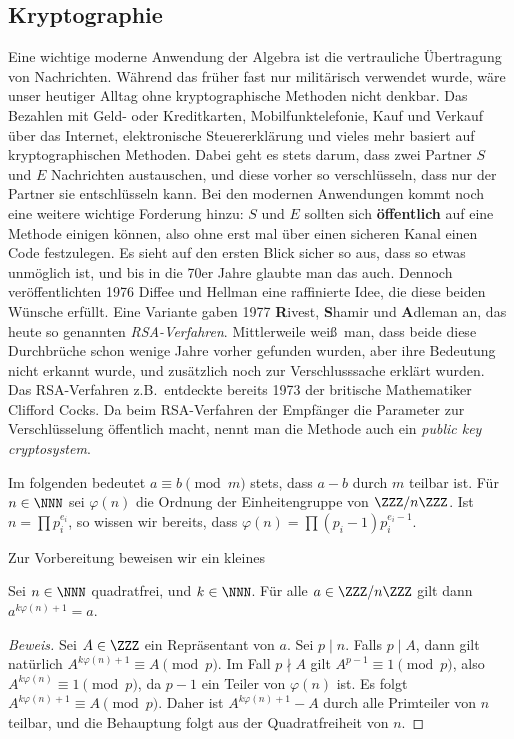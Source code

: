 \documentclass[12pt,a4paper,twoside]{article}
\newcommand{\ei}[1]{\emph{#1}\index{#1}}
\begin{document}
\subsection{Kryptographie}
Eine wichtige moderne Anwendung der Algebra ist die vertrauliche \"Ubertragung
von Nachrichten. W\"ahrend das fr\"uher fast nur milit\"arisch verwendet
wurde, w\"are unser heutiger Alltag ohne kryptographische Methoden nicht
denkbar. Das Bezahlen mit Geld- oder Kreditkarten, Mobilfunktelefonie, Kauf
und Verkauf \"uber das Internet, elektronische Steuererkl\"arung und vieles
mehr basiert auf kryptographischen Methoden. Dabei geht es stets darum, dass
zwei Partner $S$ und $E$ Nachrichten austauschen, und diese vorher so
verschl\"usseln, dass nur der Partner sie entschl\"usseln kann. Bei den
modernen Anwendungen kommt noch eine weitere wichtige Forderung hinzu: $S$ und
$E$ sollten sich \textbf{\"offentlich} auf eine Methode einigen k\"onnen, also
ohne erst mal \"uber einen sicheren Kanal einen Code festzulegen. Es sieht auf
den ersten Blick sicher so aus, dass so etwas unm\"oglich ist, und bis in die
70er Jahre glaubte man das auch. Dennoch ver\"offentlichten 1976 Diffee und
Hellman eine raffinierte Idee, die diese beiden W\"unsche erf\"ullt. Eine
Variante gaben 1977 \textbf{R}ivest, \textbf{S}hamir und \textbf{A}dleman an,
das heute so genannten \ei{RSA-Verfahren}. Mittlerweile wei\ss\ man, dass
beide diese Durchbr\"uche schon wenige Jahre vorher gefunden wurden, aber ihre
Bedeutung nicht erkannt wurde, und zus\"atzlich noch zur Verschlusssache
erkl\"art wurden. Das RSA-Verfahren z.B.\ entdeckte bereits 1973 der britische
Mathematiker Clifford Cocks. Da beim RSA-Verfahren der Empf\"anger die
Parameter zur Verschl\"usselung \"offentlich macht, nennt man die Methode auch
ein \ei{public key cryptosystem}.

Im folgenden bedeutet $a\equiv b\pmod{m}$ stets, dass $a-b$ durch $m$ teilbar
ist. F\"ur $n\in\NNN$ sei $\varphi(n)$ die Ordnung der Einheitengruppe von
$\ZZZ/n\ZZZ$. Ist $n=\prod p_i^{e_i}$, so wissen wir bereits, dass
$\varphi(n)=\prod (p_i-1)p_i^{e_i-1}$.

Zur Vorbereitung beweisen wir ein kleines
\begin{Lemma}
  Sei $n\in\NNN$ quadratfrei, und $k\in\NNN$. F\"ur alle $a\in\ZZZ/n\ZZZ$ gilt
  dann $a^{k\varphi(n)+1}=a$.
\end{Lemma}
\begin{proof}[Beweis]
  Sei $A\in\ZZZ$ ein Repr\"asentant von $a$. Sei $p\mid n$. Falls $p\mid A$,
  dann gilt nat\"urlich $A^{k\varphi(n)+1}\equiv A\pmod{p}$. Im Fall $p\nmid
  A$ gilt $A^{p-1}\equiv 1\pmod{p}$, also $A^{k\varphi(n)}\equiv 1\pmod{p}$,
  da $p-1$ ein Teiler von $\varphi(n)$ ist. Es folgt $A^{k\varphi(n)+1}\equiv
  A\pmod{p}$. Daher ist $A^{k\varphi(n)+1}-A$ durch alle Primteiler von $n$
  teilbar, und die Behauptung folgt aus der Quadratfreiheit von $n$.
\end{proof}
\end{document}
